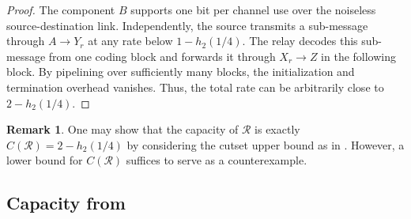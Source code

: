 \documentclass[12pt]{article}
\theoremstyle{definition}
\newtheorem{remark}[theorem]{Remark}
\begin{document}
\begin{proof}
The component $B$ supports one bit per channel use over the noiseless source-destination link. Independently, the source transmits a sub-message through $A \to Y_r$ at any rate below $1 - h_2(1/4)$. The relay decodes this sub-message from one coding block and forwards it through $X_r \to Z$ in the following block. By pipelining over sufficiently many blocks, the initialization and termination overhead vanishes. Thus, the total rate can be arbitrarily close to $2 - h_2(1/4)$.
\end{proof}

\begin{remark}
    One may show that the capacity of $\mathcal R$ is exactly $C(\mathcal R) = 2 - h_2(1/4)$ by considering the cutset upper bound as in \cite{el11}. However, a lower bound for $C(\mathcal R)$ suffices to serve as a counterexample.
\end{remark}
\subsection{Capacity from \cite{pon26}}
\end{document}
